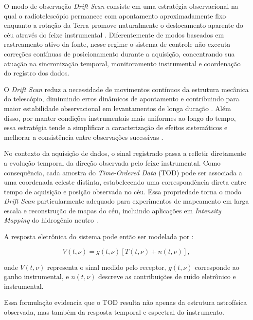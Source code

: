 O modo de observação \textit{Drift Scan} consiste em uma estratégia observacional na qual o radiotelescópio permanece com apontamento aproximadamente fixo enquanto a rotação da Terra promove naturalmente o deslocamento aparente do céu através do feixe instrumental \cite{chatterjee2023driftscan}. Diferentemente de modos baseados em rastreamento ativo da fonte, nesse regime o sistema de controle não executa correções contínuas de posicionamento durante a aquisição, concentrando sua atuação na sincronização temporal, monitoramento instrumental e coordenação do registro dos dados.

O \textit{Drift Scan} reduz a necessidade de movimentos contínuos da estrutura mecânica do telescópio, diminuindo erros dinâmicos de apontamento e contribuindo para maior estabilidade observacional em levantamentos de longa duração \cite{boyles2013driftscan}. Além disso, por manter condições instrumentais mais uniformes ao longo do tempo, essa estratégia tende a simplificar a caracterização de efeitos sistemáticos e melhorar a consistência entre observações sucessivas \cite{chatterjee2023driftscan}.

No contexto da aquisição de dados, o sinal registrado passa a refletir diretamente a evolução temporal da direção observada pelo feixe instrumental. Como consequência, cada amostra do \textit{Time-Ordered Data} (TOD) pode ser associada a uma coordenada celeste distinta, estabelecendo uma correspondência direta entre tempo de aquisição e posição observada no céu. Essa propriedade torna o modo \textit{Drift Scan} particularmente adequado para experimentos de mapeamento em larga escala e reconstrução de mapas do céu, incluindo aplicações em \textit{Intensity Mapping} do hidrogênio neutro \cite{battye2012bingo, chatterjee2023driftscan}.

A resposta eletrônica do sistema pode então ser modelada por \cite{li2023fastdriftscan}:

\begin{equation}
V(t,\nu)=
g(t,\nu)
\left[
T(t,\nu)+n(t,\nu)
\right],
\end{equation}

onde $V(t,\nu)$ representa o sinal medido pelo receptor, $g(t,\nu)$ corresponde ao ganho instrumental, e $n(t,\nu)$ descreve as contribuições de ruído eletrônico e instrumental.

Essa formulação evidencia que o TOD resulta não apenas da estrutura astrofísica observada, mas também da resposta temporal e espectral do instrumento.

